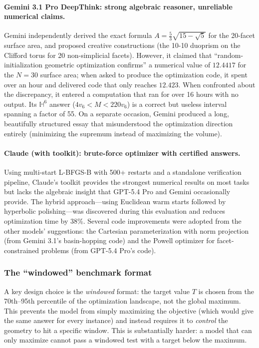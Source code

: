 \documentclass[11pt]{article}
\begin{document}
\paragraph{Gemini 3.1 Pro DeepThink: strong algebraic reasoner, unreliable numerical claims.}
Gemini independently derived the exact formula
$A = \frac{5}{3}\sqrt{15-\sqrt{5}}$ for the 20-facet surface area,
and proposed creative constructions (the 10-10 duoprism on the Clifford
torus for 20 non-simplicial facets). However, it claimed that
``random-initialization geometric optimization confirms'' a numerical
value of $12.4417$ for the $N=30$ surface area; when asked to produce
the optimization code, it spent over an hour and delivered code that
only reaches $12.423$. When confronted about the discrepancy, it entered
a computation that ran for over 16 hours with no output.
Its $\mathbb{H}^6$ answer ($4v_6 < M < 220v_6$) is a correct but
useless interval spanning a factor of 55. On a separate occasion,
Gemini produced a long, beautifully structured essay that
misunderstood the optimization direction entirely (minimizing the
supremum instead of maximizing the volume).

\paragraph{Claude (with toolkit): brute-force optimizer with certified answers.}
Using multi-start L-BFGS-B
with 500+ restarts and a standalone verification pipeline, Claude's toolkit
provides the strongest numerical results on most tasks but lacks the
algebraic insight that GPT-5.4 Pro and Gemini occasionally provide. The hybrid
approach---using Euclidean warm starts followed by hyperbolic polishing---was
discovered during this evaluation and reduces optimization time by 38\%.
Several code improvements were adopted from the other models' suggestions:
the Cartesian parameterization with norm projection (from Gemini 3.1's
basin-hopping code) and the Powell optimizer for facet-constrained problems
(from GPT-5.4 Pro's code).

\subsubsection{The ``windowed'' benchmark format}

A key design choice is the \emph{windowed} format: the target value $T$
is chosen from the 70th--95th percentile of the optimization landscape,
not the global maximum. This prevents the model from simply maximizing
the objective (which would give the same answer for every instance) and
instead requires it to \emph{control} the geometry to hit a specific window.
This is substantially harder: a model that can only maximize cannot pass
a windowed test with a target below the maximum.
\end{document}
